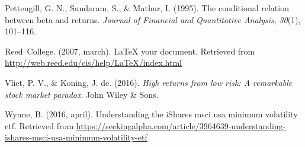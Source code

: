 \documentclass[12pt,twoside]{reedthesis}
\theoremstyle{definition}
\theoremstyle{definition}
\theoremstyle{definition}
\theoremstyle{remark}
\begin{document}
\hypertarget{ref-pettengill1995}{}
Pettengill, G. N., Sundaram, S., \& Mathur, I. (1995). The conditional
relation between beta and returns. \emph{Journal of Financial and
Quantitative Analysis}, \emph{30}(1), 101--116.

\hypertarget{ref-reedweb2007}{}
Reed~College. (2007, march). LaTeX your document. Retrieved from
\url{http://web.reed.edu/cis/help/LaTeX/index.html}

\hypertarget{ref-van2016}{}
Vliet, P. V., \& Koning, J. de. (2016). \emph{High returns from low
risk: A remarkable stock market paradox}. John Wiley \& Sons.

\hypertarget{ref-wynne2016}{}
Wynne, B. (2016, april). Understanding the iShares msci usa minimum
volatility etf. Retrieved from
\url{https://seekingalpha.com/article/3964639-understanding-ishares-msci-usa-minimum-volatility-etf}


\end{document}
